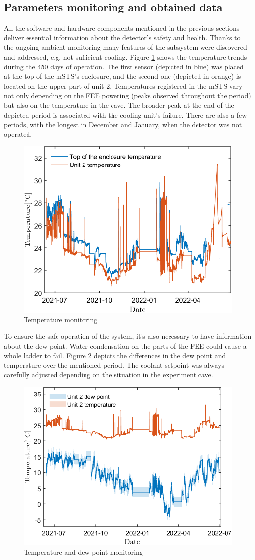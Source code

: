 \subsection{Parameters monitoring and obtained data}
All the software and hardware components mentioned in the previous sections deliver essential information about the detector's safety and health. Thanks to the ongoing ambient monitoring many features of the subsystem were discovered and addressed, e.g. not sufficient cooling. Figure \ref{fig_temp} shows the temperature trends during the 450 days of operation. The first sensor (depicted in blue) was placed at the top of the \gls{mSTS}'s enclosure, and the second one (depicted in orange) is located on the upper part of unit 2. Temperatures registered in the \gls{mSTS} vary not only depending on the \gls{FEE} powering (peaks observed throughout the period) but also on the temperature in the cave. The broader peak at the end of the depicted period is associated with the cooling unit's failure.  There are also a few periods, with the longest in December and January, when the detector was not operated. 

\begin{figure}[!h]
\centering
\includegraphics[width=0.55\columnwidth]{Chapter6/DCS/images/temp2.png}
\caption{Temperature monitoring}
\label{fig_temp}
\end{figure}

To ensure the safe operation of the system, it's also necessary to have information about the dew point. Water condensation on the parts of the \gls{FEE} could cause a whole ladder to fail. Figure \ref{fig_dew} depicts the differences in the dew point and temperature over the mentioned period. The coolant setpoint was always carefully adjusted depending on the situation in the experiment cave. 
\newpage
\begin{figure}[!h]
\centering
\includegraphics[width=0.55\columnwidth]{Chapter6/DCS/images/dew.png}
\caption{Temperature and dew point monitoring}
\label{fig_dew}
\end{figure}



